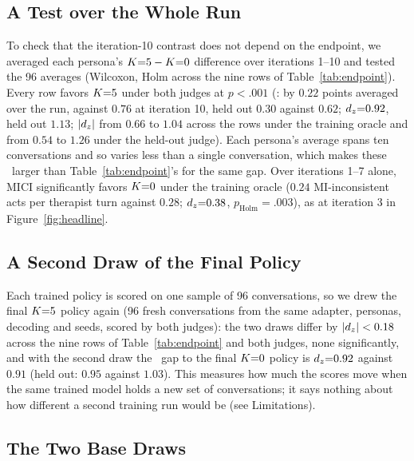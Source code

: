 \subsection{A Test over the Whole Run}
\label{app:wholerun}

To check that the iteration-10 contrast does not depend on the
endpoint, we averaged each persona's $K{=}5 - K{=}0$ difference over iterations 1--10 and tested the 96
averages (Wilcoxon, Holm across the nine rows of Table~\ref{tab:endpoint}). Every row favors $K{=}5$
under both judges at $p < .001$ (\QQ: by $0.22$ points averaged over the run, against $0.76$ at
iteration 10, held out $0.30$ against $0.62$; $d_z{=}0.92$, held out $1.13$; $|d_z|$ from $0.66$
to $1.04$ across the rows under the training oracle and from $0.54$ to $1.26$ under the held-out
judge). Each persona's average spans ten conversations and so varies less than a single
conversation, which makes these \dz\ larger than Table~\ref{tab:endpoint}'s for the same gap. Over
iterations 1--7 alone, MICI significantly favors $K{=}0$ under the training oracle ($0.24$ MI-inconsistent acts per
therapist turn against $0.28$; $d_z{=}0.38$, $p_{\mathrm{Holm}}{=}.003$), as at iteration 3 in Figure~\ref{fig:headline}.

\subsection{A Second Draw of the Final Policy}
\label{app:seconddraw}

Each trained policy is scored on one sample of 96 conversations, so we drew the final $K{=}5$ policy
again (96 fresh conversations from the same adapter, personas, decoding and seeds, scored by both
judges): the two draws differ by $|d_z| < 0.18$ across the nine rows of Table~\ref{tab:endpoint}
and both judges, none significantly, and with the second draw the \QQ\ gap to the final $K{=}0$
policy is $d_z{=}0.92$ against $0.91$ (held out: $0.95$ against $1.03$).
This measures how much the scores move when the same trained model holds a new set of
conversations; it says nothing about how different a second training run would be (see
Limitations).

\subsection{The Two Base Draws}
\label{app:basedraws}

